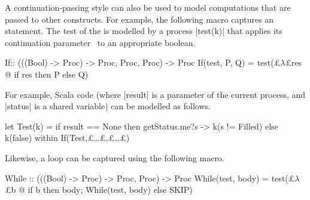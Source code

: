 A continuation-passing style can also be used to model computations that are
passed to other constructs.  For example, the following macro captures an
 statement.  The test of the  is modelled by a process
|test(k)| that applies its continuation parameter~ to
an appropriate boolean.
%
\begin{cspm}
If:: (((Bool) -> Proc) -> Proc, Proc, Proc) -> Proc
If(test, P, Q) = test(£$\lambda$£res @ if res then P else Q)
\end{cspm}
%
For example, Scala code  (where |result| is a parameter of the current process, and
|status| is a shared variable) can be modelled as follows. 
%
\begin{cspm}
let Test(k) = if result == None then getStatus.me?s -> k(s != Filled) else k(false) within If(Test,£\ldots£,£\ldots£)
\end{cspm}
%
Likewise, a  loop can be captured using the following macro.
%
\begin{cspm}
While :: (((Bool) -> Proc) -> Proc, Proc) -> Proc
While(test, body) = test(£$\lambda$£b @ if b then body; While(test, body) else SKIP)
\end{cspm}
